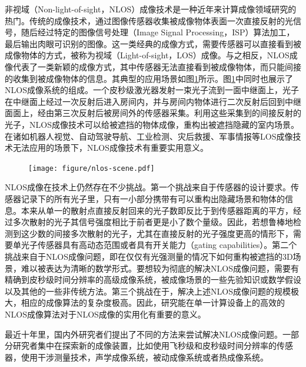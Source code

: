 \documentclass[master]{shtthesis}             %
\begin{document}
非视域（Non-light-of-sight，NLOS）成像技术是一种近年来计算成像领域研究的热门。传统的成像技术，通过图像传感器收集被成像物体表面一次直接反射的光信号，随后经过特定的图像信号处理（Image Signal Processing，ISP）算法加工，最后输出肉眼可识别的图像。这一类经典的成像方式，需要传感器可以直接看到被成像物体的方式，被称为视域（Light-of-sight，LOS）成像。与之相反，NLOS成像代表了一类新颖的成像方式，其中传感器无法直接看到被成像物体，而只能间接的收集到被成像物体的信息。其典型的应用场景如图\ref{fig:nlos_scene}所示。图\ref{fig:nlos_scene}中同时也展示了NLOS成像系统的组成。一个皮秒级激光器发射一束光子流到一面中继面上，光子在中继面上经过一次反射后进入房间内，并与房间内物体进行二次反射后回到中继面面上，经由第三次反射后被房间外的传感器采集。利用这些采集到的间接反射的光子，NLOS成像技术可以给被遮挡的物体成像，重构出被遮挡隐藏的室内场景。在诸如机器人视觉、自动驾驶导航、工业检测、灾后救援、军事情报等LOS成像技术无法应用的场景下，NLOS成像技术有重要实用意义。%

\begin{figure}[tb]
  \centering
  \texttt{[image: figure/nlos-scene.pdf]}
  \label{fig:nlos_scene}
\end{figure}

NLOS成像在技术上仍然存在不少挑战。第一个挑战来自于传感器的设计要求。传感器记录下的所有光子里，只有一小部分携带有可以重构出隐藏场景和物体的信息。本来从单一的散射点直接反射回来的光子数即反比于到传感器距离的平方，经过多次散射的光子其信号强度相比于前者更是小了数个量级。因此，若想鲁棒地检测到这少数的间接多次散射的光子，尤其在直接反射的光子强度更高的情形下，需要单光子传感器具有高动态范围或者具有开关能力（gating capabilities）。第二个挑战来自于NLOS成像问题，即在仅仅有光强测量的情况下如何重构被遮挡的3D场景，难以被表达为清晰的数学形式。要想较为彻底的解决NLOS成像问题，需要有精确到皮秒级时间分辨率的高级成像系统，被成像场景的一些先验知识或数学假设以及其他的一些非传统方法。第三个挑战在于，解决上述NLOS成像问题的规模极大，相应的成像算法的复杂度极高。因此，研究能在单一计算设备上的高效的NLOS成像算法对于NLOS成像的实用化有重要的意义。

最近十年里，国内外研究者们提出了不同的方法来尝试解决NLOS成像问题。一部分研究者集中在探索新的成像装置，比如使用飞秒级和皮秒级时间分辨率的传感器\citep{Velten2012,Otoole2018,Liu2019,DavidB.Lindell2019}，使用干涉测量技术\citep{bertolotti2012non,katz2014non}，声学成像系统\citep{lindell2019acoustic}，被动成像系统\citep{bouman2017turning,saunders2019computational,boger2019passive}或者热成像系统。
\end{document}
